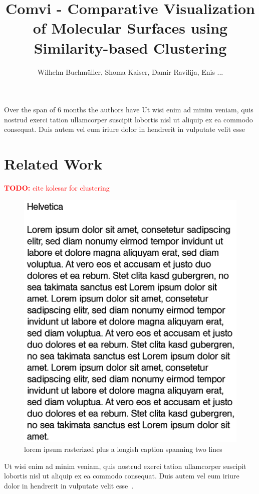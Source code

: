 \documentclass[journal]{vgtc}       %
\title{Comvi - Comparative Visualization of Molecular Surfaces using Similarity-based Clustering}
\author{Wilhelm Buchm\"uller, Shoma Kaiser, Damir Ravilija, Enis ...}
\newcommand{\todo}[1]{\textcolor{red}{\textbf{TODO:} #1}}
\begin{document}

\label{sec:intro}
%
\maketitle
%
Over the span of 6 months the authors have
Ut wisi enim ad minim veniam, quis nostrud exerci tation ullamcorper suscipit lobortis nisl ut aliquip ex ea commodo consequat. Duis autem vel eum iriure dolor in hendrerit in vulputate velit esse

\section{Related Work}\label{sec:relatedWork}

\todo{cite kolesar for clustering}

\begin{figure}
  \begin{center}
  \includegraphics[width=.45\linewidth]{Lorem_Ipsum_Helvetica.png}
  \end{center}
  \caption{\label{fig:lorem} lorem ipsum rasterized plus a longish caption spanning two lines}
\end{figure}

Ut wisi enim ad minim veniam, quis nostrud exerci tation ullamcorper suscipit lobortis nisl ut aliquip ex ea commodo consequat. Duis autem vel eum iriure dolor in hendrerit in vulputate velit esse~\cite{Kindlmann1999}.
\end{document}
